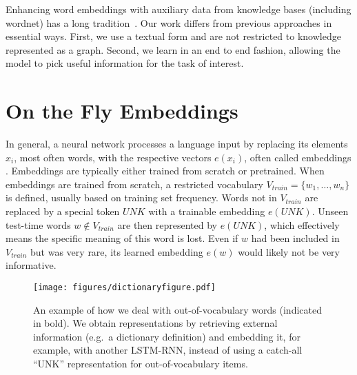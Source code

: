 Enhancing word embeddings with auxiliary data from knowledge bases (including wordnet) has a long tradition~\citep{Xu:2014:RGF:2661829.2662038, faruqui2014retrofitting}. Our work differs from previous approaches in essential ways. First, we use a textual form and are not restricted to knowledge represented as a graph. Second, we learn in an end to end fashion, allowing the model to pick useful information for the task of interest.



\section{On the Fly Embeddings}
\label{sec:methods}

In general, a neural network processes a language input by replacing its elements $x_i$, most often words, with the respective vectors $e(x_i)$, often called embeddings \citep{bengio2003neural}. Embeddings are typically either trained from scratch or pretrained. When embeddings are trained from scratch, a restricted vocabulary $V_{train}=\{w_1,\ldots,w_{n}\}$ is defined, usually based on training set frequency.
Words not in $V_{train}$ are replaced by a special token $\mathit{UNK}$ with a trainable embedding $e(\mathit{UNK})$. Unseen test-time words $w \notin V_{train}$ are then represented by $e(\mathit{UNK})$, which effectively means the specific meaning of this word is lost. Even if $w$ had been included in $V_{train}$ but was very rare, its learned embedding $e(w)$ would likely not be very informative.
\begin{figure}
\centering
\texttt{[image: figures/dictionaryfigure.pdf]}
\caption{\label{fig:dictionaryembed}An example of how we deal with out-of-vocabulary words (indicated in bold). We obtain representations by retrieving external information (e.g.~a dictionary definition) and embedding it, for example, with another LSTM-RNN, instead of using a catch-all ``UNK'' representation for out-of-vocabulary items.}
\end{figure}

